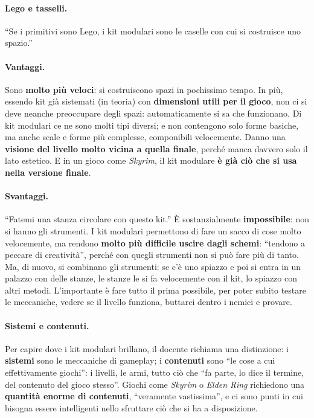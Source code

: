 \paragraph{Lego e tasselli.} ``Se i primitivi sono Lego, i kit modulari sono le
caselle con cui si costruisce uno spazio.''

\paragraph{Vantaggi.} Sono \textbf{molto più veloci}: si costruiscono spazi in
pochissimo tempo. In più, essendo kit già sistemati (in teoria) con
\textbf{dimensioni utili per il gioco}, non ci si deve neanche preoccupare degli
spazi: automaticamente si sa che funzionano. Di kit modulari ce ne sono molti
tipi diversi; e non contengono solo forme basiche, ma anche scale e forme più
complesse, componibili velocemente. Danno una \textbf{visione del livello molto
vicina a quella finale}, perché manca davvero solo il lato estetico. E in un
gioco come \emph{Skyrim}, il kit modulare \textbf{è già ciò che si usa nella
versione finale}.

\paragraph{Svantaggi.} ``Fatemi una stanza circolare con questo kit.'' È
sostanzialmente \textbf{impossibile}: non si hanno gli strumenti. I kit modulari
permettono di fare un sacco di cose molto velocemente, ma rendono \textbf{molto
più difficile uscire dagli schemi}: ``tendono a peccare di creatività'', perché
con quegli strumenti non si può fare più di tanto. Ma, di nuovo, si combinano
gli strumenti: se c'è uno spiazzo e poi si entra in un palazzo con delle stanze,
le stanze le si fa velocemente con il kit, lo spiazzo con altri metodi.
L'importante è fare tutto il prima possibile, per poter subito testare le
meccaniche, vedere se il livello funziona, buttarci dentro i nemici e provare.

\paragraph{Sistemi e contenuti.} Per capire dove i kit modulari brillano, il
docente richiama una distinzione: i \textbf{sistemi} sono le meccaniche di
gameplay; i \textbf{contenuti} sono ``le cose a cui effettivamente giochi'': i
livelli, le armi, tutto ciò che ``fa parte, lo dice il termine, del contenuto
del gioco stesso''. Giochi come \emph{Skyrim} o \emph{Elden Ring} richiedono una
\textbf{quantità enorme di contenuti}, ``veramente vastissima'', e ci sono punti
in cui bisogna essere intelligenti nello sfruttare ciò che si ha a disposizione.

